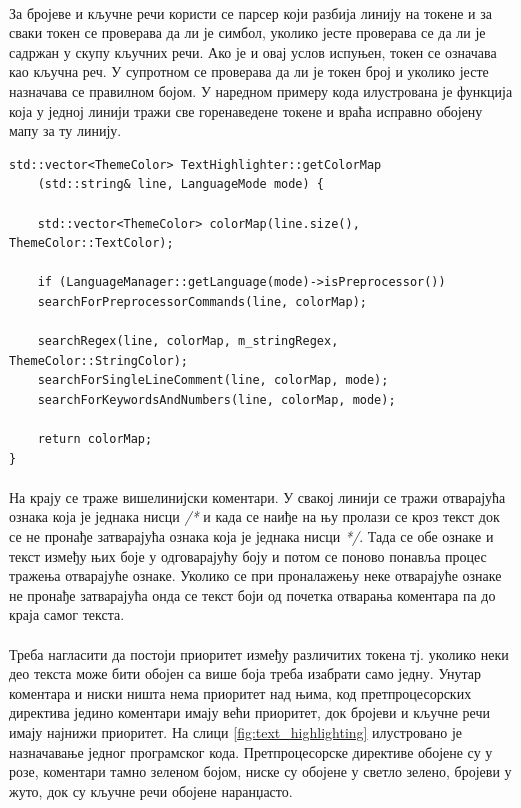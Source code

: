 \documentclass[12pt,oneside]{memoir}
\begin{document}
\paragraph{}
За бројеве и кључне речи користи се парсер који разбија линију на токене и за 
сваки токен се проверава да ли је симбол, уколико јесте проверава се да ли је 
садржан у скупу кључних речи. Ако је и овај услов испуњен, токен се означава 
као кључна реч. У супротном се проверава да ли је токен број и уколико јесте
назначава се правилном бојом. У наредном примеру кода илустрована је функција
која у једној линији тражи све горенаведене токене и враћа исправно обојену
мапу за ту линију.

\begin{verbatim}
std::vector<ThemeColor> TextHighlighter::getColorMap
	(std::string& line, LanguageMode mode) {
		
	std::vector<ThemeColor> colorMap(line.size(), ThemeColor::TextColor);
	
	if (LanguageManager::getLanguage(mode)->isPreprocessor())
	searchForPreprocessorCommands(line, colorMap);
	
	searchRegex(line, colorMap, m_stringRegex, ThemeColor::StringColor);
	searchForSingleLineComment(line, colorMap, mode);
	searchForKeywordsAndNumbers(line, colorMap, mode);
	
	return colorMap;
}
\end{verbatim}

\paragraph{}
На крају се траже вишелинијски коментари. У свакој линији се тражи отварајућа
ознака која је једнака нисци \textit{/*} и када се наиђе на њу пролази се кроз
текст док се не пронађе затварајућа ознака која је једнака нисци \textit{*/}.
Тада се обе ознаке и текст између њих боје у одговарајућу боју и потом се поново
понавља процес тражења отварајуће ознаке. Уколико се при проналажењу неке отварајуће
ознаке не пронађе затварајућа онда се текст боји од почетка отварања коментара па до краја самог текста.

\paragraph{}
Треба нагласити да постоји приоритет између различитих токена тј.
уколико неки део текста може бити обојен са више боја треба изабрати
само једну. Унутар коментара и ниски ништа нема приоритет над њима,
код претпроцесорских директива једино коментари имају већи приоритет,
док бројеви и кључне речи имају најнижи приоритет.
На слици \ref{fig:text_highlighting} илустровано је назначавање
једног програмског кода.  Претпроцесорске директиве обојене су у розе,
коментари тамно зеленом бојом, ниске су обојене у светло зелено, бројеви у
жуто, док су кључне речи обојене наранџасто.
\end{document}
